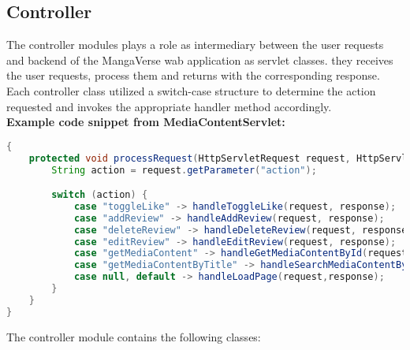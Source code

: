 \subsection*{Controller}
The controller modules plays a role as intermediary between the user requests and backend of the MangaVerse wab application as servlet classes.
they receives the user requests, process them and returns with the corresponding response.
Each controller class utilized a switch-case structure to determine the action requested and invokes the appropriate handler method accordingly.\\
\newline
\textbf{Example code snippet from MediaContentServlet:}
\begin{mdframed}[backgroundcolor=yellow!20, innerleftmargin=10pt, innerrightmargin=10pt]
    \begin{lstlisting}[language=java]
{
    protected void processRequest(HttpServletRequest request, HttpServletResponse response) throws ServletException, IOException {
        String action = request.getParameter("action");

        switch (action) {
            case "toggleLike" -> handleToggleLike(request, response);
            case "addReview" -> handleAddReview(request, response);
            case "deleteReview" -> handleDeleteReview(request, response);
            case "editReview" -> handleEditReview(request, response);
            case "getMediaContent" -> handleGetMediaContentById(request,response);
            case "getMediaContentByTitle" -> handleSearchMediaContentByTitle(request,response);
            case null, default -> handleLoadPage(request,response);
        }
    }
}
    \end{lstlisting}
\end{mdframed}
The controller module contains the following classes:
